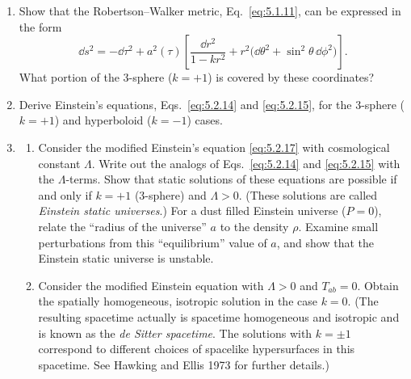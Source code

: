 
\chapterproblems

\begin{enumerate}[label=\arabic*.,leftmargin=*]
\item Show that the Robertson--Walker metric, Eq.~\eqref{eq:5.1.11}, can be
expressed in the form
\begin{equation*}
  \dd s^2=-\dd\tau^2+a^2(\tau)\left[
    \frac{\dd r^2}{1-kr^2}+r^2\bigl(\dd\theta^2+\sin^2\theta\,\dd\phi^2\bigr)
  \right].
\end{equation*}
What portion of the 3-sphere (\(k=+1\)) is covered by these coordinates?

\item Derive Einstein's equations, Eqs.~\eqref{eq:5.2.14} and \eqref{eq:5.2.15},
for the 3-sphere (\(k=+1\)) and hyperboloid (\(k=-1\)) cases.

\item
\begin{enumerate}[label=\alph*),leftmargin=2.5em]
\item Consider the modified Einstein's equation \eqref{eq:5.2.17} with cosmological
constant \(\Lambda\). Write out the analogs of Eqs.~\eqref{eq:5.2.14} and
\eqref{eq:5.2.15} with the \(\Lambda\)-terms. Show that static solutions of these
equations are possible if and only if \(k=+1\) (3-sphere) and \(\Lambda>0\).
(These solutions are called \emph{Einstein static universes}.) For a dust filled
Einstein universe (\(P=0\)), relate the ``radius of the universe'' \(a\) to the density
\(\rho\). Examine small perturbations from this ``equilibrium'' value of \(a\), and
show that the Einstein static universe is unstable.

\par\medskip

\item Consider the modified Einstein equation with \(\Lambda>0\) and \(T_{ab}=0\).
Obtain the spatially homogeneous, isotropic solution in the case \(k=0\). (The
resulting spacetime actually is spacetime homogeneous and isotropic and is known as
the \emph{de Sitter spacetime}. The solutions with \(k=\pm1\) correspond to different
choices of spacelike hypersurfaces in this spacetime. See Hawking and Ellis 1973 for
further details.)
\end{enumerate}


\end{enumerate}
